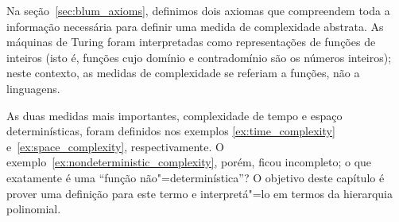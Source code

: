 Na seção~\ref{sec:blum_axioms},
definimos dois axiomas que compreendem toda a informação necessária
para definir uma medida de complexidade abstrata.
As máquinas de Turing foram interpretadas como
representações de funções de inteiros
(isto é, funções cujo domínio e contradomínio são os números inteiros);
neste contexto,
as medidas de complexidade
se referiam a funções, não a linguagens.

As duas medidas mais importantes,
complexidade de tempo e espaço determinísticas,
foram definidos nos exemplos
\ref{ex:time_complexity} e~\ref{ex:space_complexity},
respectivamente.
O exemplo~\ref{ex:nondeterministic_complexity},
porém,
ficou incompleto;
o que exatamente é uma ``função não"=determinística''?
O objetivo deste capítulo é prover uma definição para este termo
e interpretá"=lo em termos da hierarquia polinomial.
